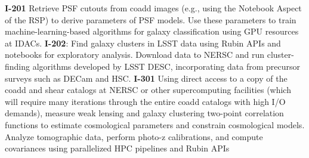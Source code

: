 \textbf{I-201} Retrieve PSF cutouts from coadd images (e.g., using the Notebook Aspect of the RSP) to derive parameters of PSF models. Use these parameters to train machine-learning-based algorithms for galaxy classification using GPU resources at IDACs.
\textbf{I-202}: Find galaxy clusters in LSST data using Rubin APIs and notebooks for exploratory analysis. Download data to NERSC and run cluster-finding algorithms developed by LSST DESC, incorporating data from precursor surveys such as DECam and HSC.
\textbf{I-301} Using direct access to a copy of the coadd and shear catalogs at NERSC or other supercomputing facilities (which will require many iterations through the entire coadd catalogs with high I/O demands), measure weak lensing and galaxy clustering two-point correlation functions to estimate cosmological parameters and constrain cosmological models. Analyze tomographic data, perform photo-z calibrations, and compute covariances using parallelized HPC pipelines and Rubin APIs
